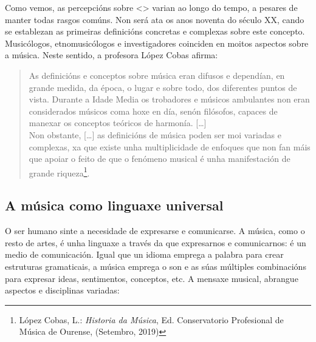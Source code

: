 \documentclass[a4paper, twoside]{templates/ociamthesis}
\begin{document}
Como vemos, as percepcións sobre \textless{}\textgreater{} varian ao longo do tempo, a pesares de manter todas rasgos comúns. Non será ata os anos noventa do século XX, cando se establezan as primeiras definicións concretas e complexas sobre este concepto. Musicólogos, etnomusicólogos e investigadores coinciden en moitos aspectos sobre a música. Neste sentido, a profesora López Cobas afirma:

\begin{quote}
As definicións e conceptos sobre música eran difusos e dependían, en grande medida, da época, o lugar e sobre todo, dos diferentes puntos de vista. Durante a Idade Media os trobadores e músicos ambulantes non eran considerados músicos coma hoxe en día, senón filósofos, capaces de manexar os conceptos teóricos de harmonía. {[}\ldots{]}\\
Non obstante, {[}\ldots{]} as definicións de música poden ser moi variadas e complexas, xa que existe unha multiplicidade de enfoques que non fan máis que apoiar o feito de que o fenómeno musical é unha manifestación de grande riqueza\footnote{López Cobas, L.: \emph{Historia da Música}, Ed. Conservatorio Profesional de Música de Ourense, (Setembro, 2019)}.
\end{quote}

\hypertarget{a-muxfasica-como-linguaxe-universal}{%
\subsection*{A música como linguaxe universal}\label{a-muxfasica-como-linguaxe-universal}}

O ser humano sinte a necesidade de expresarse e comunicarse. A música, como o resto de artes, é unha linguaxe a través da que expresarnos e comunicarnos: é un medio de comunicación. Igual que un idioma emprega a palabra para crear estruturas gramaticais, a música emprega o son e as súas múltiples combinacións para expresar ideas, sentimentos, conceptos, etc. A mensaxe musical, abrangue aspectos e disciplinas variadas:
\end{document}
